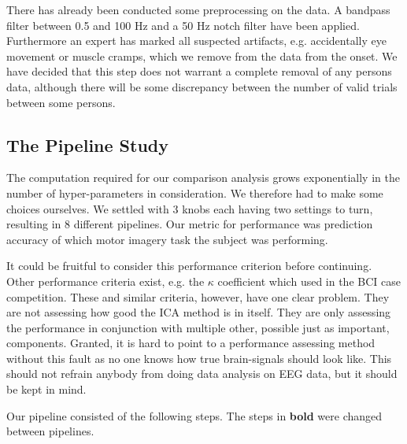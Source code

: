 	There has already been conducted some preprocessing on the data. A bandpass filter between 0.5 and 100 Hz and a 50 Hz notch filter have been applied. Furthermore an expert has marked all suspected artifacts, e.g. accidentally eye movement or muscle cramps, which we remove from the data from the onset. We have decided that this step does not warrant a complete removal of any persons data, although there will be some discrepancy between the number of valid trials between some persons. 

\subsection{The Pipeline Study}\label{sec:experimental-setup}

	The computation required for our comparison analysis grows exponentially in the number of hyper-parameters in consideration. We therefore had to make some choices ourselves. We settled with 3 knobs each having two settings to turn, resulting in 8 different pipelines. Our metric for performance was prediction accuracy of which motor imagery task the subject was performing. 

	It could be fruitful to consider this performance criterion before continuing. Other performance criteria exist, e.g. the $\kappa$ coefficient which \cite{bcireview2012} used in the BCI case competition. These and similar criteria, however, have one clear problem. They are not assessing how good the ICA method is in itself. They are only assessing the performance in conjunction with multiple other, possible just as important, components. Granted, it is hard to point to a performance assessing method without this fault as no one knows how true brain-signals should look like. This should not refrain anybody from doing data analysis on EEG data, but it should be kept in mind.

	Our pipeline consisted of the following steps. The steps in \textbf{bold} were changed between pipelines.

